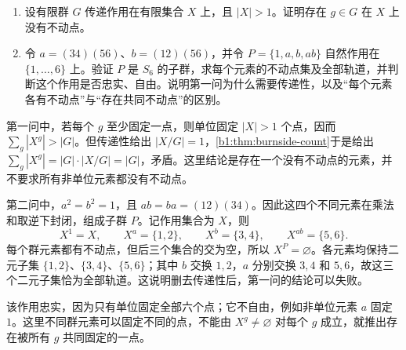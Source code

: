 \begin{exercise}\label{b1:ex:04-2}
	\begin{enumerate}
		\item 设有限群 \(G\) 传递作用在有限集合 \(X\) 上，且 \(|X|>1\)。证明存在 \(g\in G\) 在 \(X\) 上没有不动点。
		\item 令 \(a=(34)(56)\)、\(b=(12)(56)\)，并令 \(P=\{1,a,b,ab\}\) 自然作用在 \(\{1,\ldots,6\}\) 上。验证 \(P\) 是 \(S_6\) 的子群，求每个元素的不动点集及全部轨道，并判断这个作用是否忠实、自由。说明第一问为什么需要传递性，以及“每个元素各有不动点”与“存在共同不动点”的区别。
	\end{enumerate}
\end{exercise}
\begin{solution}
	第一问中，若每个 \(g\) 至少固定一点，则单位固定 \(|X|>1\) 个点，因而 \(\sum_g|X^g|>|G|\)。但传递性给出 \(|X/G|=1\)，\cref{b1:thm:burnside-count}于是给出 \(\sum_g|X^g|=|G|\cdot|X/G|=|G|\)，矛盾。这里结论是存在一个没有不动点的元素，并不要求所有非单位元素都没有不动点。

	第二问中，\(a^2=b^2=1\)，且 \(ab=ba=(12)(34)\)。因此这四个不同元素在乘法和取逆下封闭，组成子群 \(P\)。记作用集合为 \(X\)，则
	\[
		X^1=X,\qquad X^a=\{1,2\},\qquad X^b=\{3,4\},\qquad X^{ab}=\{5,6\}.
	\]
	每个群元素都有不动点，但后三个集合的交为空，所以 \(X^P=\varnothing\)。各元素均保持二元子集 \(\{1,2\}\)、\(\{3,4\}\)、\(\{5,6\}\)；其中 \(b\) 交换 \(1,2\)，\(a\) 分别交换 \(3,4\) 和 \(5,6\)，故这三个二元子集恰为全部轨道。这说明删去传递性后，第一问的结论可以失败。

	该作用忠实，因为只有单位固定全部六个点；它不自由，例如非单位元素 \(a\) 固定 \(1\)。这里不同群元素可以固定不同的点，不能由 \(X^g\neq\varnothing\) 对每个 \(g\) 成立，就推出存在被所有 \(g\) 共同固定的一点。
\end{solution}

